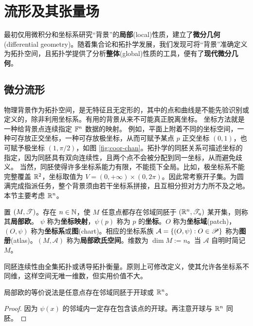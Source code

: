 \chapter{流形及其张量场}\label{appx:manifold}

最初仅用微积分和坐标系研究“背景”的\textbf{局部}(local)性质，建立了\textbf{微分几何}(differential geometry)。随着集合论和拓扑学发展，我们发现可将“背景”准确定义为拓扑空间，且拓扑学提供了分析\textbf{整体}(global)性质的工具，便有了\textbf{现代微分几何}。

\section{微分流形}
物理背景作为拓扑空间，是无特征且无定形的，其中的点和曲线是不能先验识别或定义的，除非利用坐标系。有用的背景从来不可能真正脱离坐标。
坐标方法就是一种给背景点连续指定 $\mathbb{F}^n$ 数据的映射。
例如，平面上附着不同的坐标空间，一种可存放正交坐标，一种可存放极坐标，从而可赋予某点 $p$ 正交坐标 $(0,1)$，也可赋予极坐标 $(1,\pi/2)$，如图 \ref{fig:coor-chan}。拓扑学的同胚关系可描述坐标的指定，因为同胚具有双向连续性，且两个点不会被分配到同一坐标，从而避免歧义。
当然，同胚使得许多坐标系能力有限，不能揽下全局。比如，极坐标系不能完整覆盖 $\mathbb{R}^2$，坐标取值为 $V=(0,+\infty)\times(0,2\pi)$。因此常考察开子集。为圆满完成指派任务，整个背景须由若干坐标系拼接，且互相分担对方力所不及之地。本节主要考虑 $\mathbb{R}^n$。


\begin{definition}
    置 $(M,\mathscr T)$。存在 $n\in\mathbb{N}$，使 $M$ 任意点都存在邻域同胚于 $(\mathbb{R}^n,\mathscr T_u)$ 某开集，则称其\textbf{局部欧}。
    $\psi$ 称为\textbf{坐标映射}，$\psi(p)$ 称为 $p$ 的\textbf{坐标}。$O$ 称为\textbf{坐标域}(patch)，$(O,\psi)$ 称为\textbf{坐标系}或\textbf{图}(chart)。相应的坐标系族 $\mathcal A=\{(O,\psi):O\in\mathscr P\}$ 称为\textbf{图册}(atlas)。$(M,\mathcal A)$ 称为\textbf{局部欧氏空间}。维数为 $\dim M:=n$。当 $\mathcal A$ 自明时简记 $M$。
\end{definition}

\begin{remark}
    同胚连续性由全集拓扑或诱导拓扑衡量。原则上可修改定义，使其允许各坐标系不同维，这样空间无唯一维数，但实用价值不大。
\end{remark}

\begin{theorem}
    局部欧的等价说法是任意点存在邻域同胚于开球或 $\mathbb{R}^n$。
\end{theorem}
\begin{proof}
    因为 $\psi(x)$ 的邻域内一定存在包含该点的开球。再注意开球与 $\mathbb{R}^n$ 同胚。
\end{proof}


